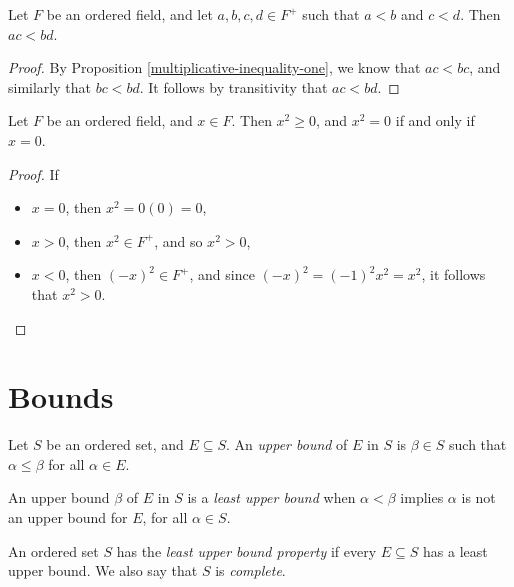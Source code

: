 \begin{prop}\label{multiplicative-inequality-two}
    Let $F$ be an ordered field, and let $a, b, c, d \in F^+$ such that $a < b$ and $c < d$. Then $ac < bd$.
\end{prop}

\begin{proof}
    By Proposition \ref{multiplicative-inequality-one}, we know that $ac < bc$, and similarly that $bc < bd$. It follows by transitivity that $ac < bd$.
\end{proof}

\begin{prop}\label{square-is-positive-or-zero}
    Let $F$ be an ordered field, and $x \in F$. Then $x^2 \geq 0$, and $x^2 = 0$ if and only if $x = 0$.
\end{prop}

\begin{proof}
    If
    \begin{itemize}
        \item $x = 0$, then $x^2 = 0(0) = 0$,
        \item $x > 0$, then $x^2 \in F^+$, and so $x^2 > 0$,
        \item $x < 0$, then $(-x)^2 \in F^+$, and since $(-x)^2 = (-1)^2x^2 = x^2$, it follows that $x^2 > 0$.
    \end{itemize}
\end{proof}

\section{Bounds}

\begin{defn}
    Let $S$ be an ordered set, and $E \subseteq S$. An \emph{upper bound} of $E$ in $S$ is $\beta \in S$ such that $\alpha \leq \beta$ for all $\alpha \in E$.
\end{defn}

\begin{defn}
    An upper bound $\beta$ of $E$ in $S$ is a \emph{least upper bound} when $\alpha < \beta$ implies $\alpha$ is not an upper bound for $E$, for all $\alpha \in S$.
\end{defn}

\begin{defn}
    An ordered set $S$ has the \emph{least upper bound property} if every $E \subseteq S$ has a least upper bound. We also say that $S$ is \emph{complete}.
\end{defn}


